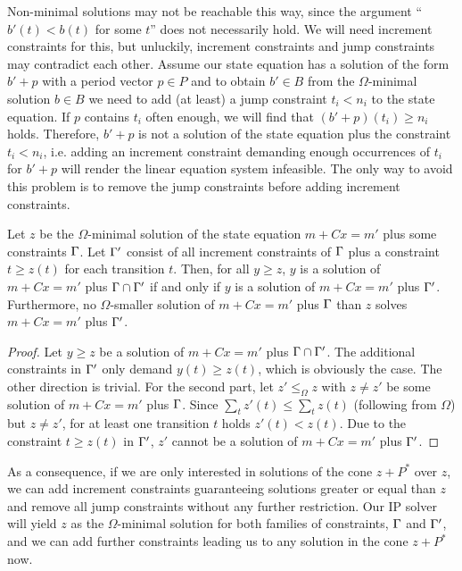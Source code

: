 \documentclass{LMCS}
\newcommand{\I}{C} \newcommand{\C}{{\ensuremath \Gamma}} \newcommand{\ord}{\ensuremath{\Omega}}
\begin{document}
Non-minimal solutions may not be reachable this way, since the argument ``$b'(t)<b(t)$ for some $t$'' does not necessarily hold.
We will need increment constraints for this, but unluckily, increment constraints and jump constraints may 
contradict each other. Assume our state equation has a solution of the form $b'+p$ with a period vector $p\in P$
and to obtain $b'\in B$ from the $\ord$-minimal solution $b\in B$ we need to add (at least) a jump constraint $t_i<n_i$ to the state equation.
If $p$ contains $t_i$ often enough, we will find that $(b'+p)(t_i)\ge n_i$ holds. Therefore, $b'+p$ is not a solution of the
state equation plus the constraint $t_i<n_i$, i.e. adding an increment constraint demanding enough occurrences of $t_i$
for $b'+p$ will render the linear equation system infeasible. The only way to avoid this problem is to remove the jump
constraints before adding increment constraints.

\begin{lem}
Let $z$ be the $\ord$-minimal solution of the state equation $m+\I x=m'$ plus some constraints $\C$. Let $\C'$ consist of all
increment constraints of $\C$ plus a constraint $t\ge z(t)$ for each transition $t$. Then, for all $y\ge z$,
$y$ is a solution of $m+\I x=m'$ plus $\C\cap\C'$ if and only if $y$ is a solution of $m+\I x=m'$ plus $\C'$.
Furthermore, no $\ord$-smaller solution of $m+\I x=m'$ plus $\C$ than $z$ solves $m+\I x=m'$ plus $\C'$.
\end{lem}
\begin{proof}
Let $y\ge z$ be a solution of $m+\I x=m'$ plus $\C\cap\C'$. The additional constraints in $\C'$ only demand $y(t)\ge z(t)$, which
is obviously the case. The other direction is trivial. For the second part, let $z'\le_{\ord} z$ with $z\not=z'$ be some solution of
$m+\I x=m'$ plus $\C$. Since $\sum_tz'(t)\le\sum_tz(t)$ (following from $\ord$) but $z\not=z'$, for at least one transition $t$ holds $z'(t)<z(t)$. 
Due to the constraint $t\ge z(t)$ in $\C'$, $z'$ cannot be a solution of $m+\I x=m'$ plus $\C'$.
\end{proof}

As a consequence, if we are only interested in solutions of the cone $z+P^*$ over $z$, we can add increment constraints guaranteeing
solutions greater or equal than $z$ and remove all jump constraints without any further restriction. Our IP solver will yield $z$ as the $\ord$-minimal
solution for both families of constraints, $\C$ and $\C'$, and we can add further constraints leading us to any solution in the
cone $z+P^*$ now.
\end{document}
